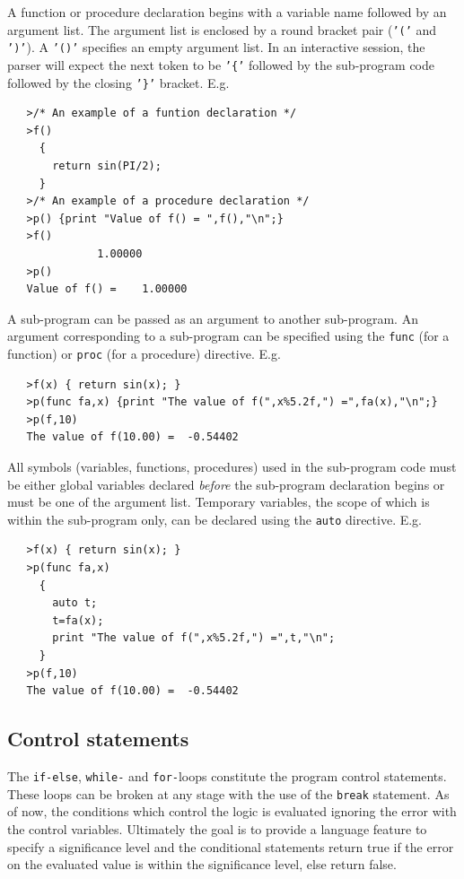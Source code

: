 \documentclass[acmtoms,acmnow]{acmtrans2m}
\begin{document}
A function or procedure declaration begins with a variable name
followed by an argument list.  The argument list is enclosed by a
round bracket pair ({\tt '('} and {\tt ')'}).  A {\tt '()'} specifies
an empty argument list.  In an interactive session, the parser will
expect the next token to be {\tt '\{'} followed by the sub-program
code followed by the closing {\tt '\}'} bracket.  E.g.
\begin{verbatim}
   >/* An example of a funtion declaration */
   >f()
     {
       return sin(PI/2);
     }
   >/* An example of a procedure declaration */ 
   >p() {print "Value of f() = ",f(),"\n";}
   >f()
              1.00000
   >p() 
   Value of f() =    1.00000
\end{verbatim}
A sub-program can be passed as an argument to another sub-program.  An
argument corresponding to a sub-program can be specified using the
{\tt func} (for a function) or {\tt proc} (for a procedure) directive.
E.g.
\begin{verbatim}
   >f(x) { return sin(x); }
   >p(func fa,x) {print "The value of f(",x%5.2f,") =",fa(x),"\n";}
   >p(f,10)
   The value of f(10.00) =  -0.54402
\end{verbatim}
All symbols (variables, functions, procedures) used in the sub-program
code must be either global variables declared {\it before} the
sub-program declaration begins or must be one of the argument list.
Temporary variables, the scope of which is within the sub-program
only, can be declared using the {\tt auto} directive.  E.g.
\begin{verbatim}
   >f(x) { return sin(x); }
   >p(func fa,x)
     {
       auto t;
       t=fa(x);
       print "The value of f(",x%5.2f,") =",t,"\n";
     }
   >p(f,10)
   The value of f(10.00) =  -0.54402
\end{verbatim}


\subsection{Control statements}

The {\tt if-else}, {\tt while-} and {\tt for-}loops constitute the
program control statements.  These loops can be broken at any stage
with the use of the {\tt break} statement.  As of now, the conditions
which control the logic is evaluated ignoring the error with the
control variables.  Ultimately the goal is to provide a language
feature to specify a significance level and the conditional statements
return true if the error on the evaluated value is within the
significance level, else return false.
\end{document}
